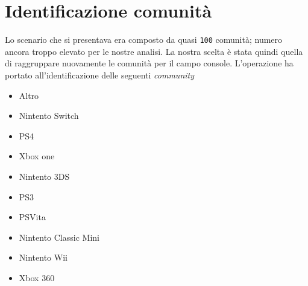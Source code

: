 		\section{Identificazione comunità}
			Lo scenario che si presentava era composto da quasi \verb|100| comunità; numero ancora troppo elevato per le nostre analisi. La nostra scelta è stata quindi quella di raggruppare nuovamente le comunità per il campo console. L'operazione ha portato all'identificazione delle seguenti \textit{community}
			\begin{itemize}			
				\item Altro
				\item Nintento Switch
				\item PS4
				\item Xbox one
				\item Nintento 3DS
				\item PS3
				\item PSVita
				\item Nintento Classic Mini
				\item Nintento Wii
				\item Xbox 360
			\end{itemize}
			